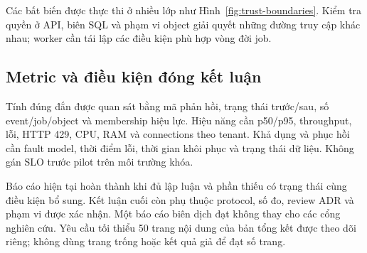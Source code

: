Các bất biến được thực thi ở nhiều lớp như Hình~\ref{fig:trust-boundaries}. Kiểm tra quyền ở API, biên SQL và phạm vi object giải quyết những đường truy cập khác nhau; worker cần tái lập các điều kiện phù hợp vòng đời job.


\subsection{Metric và điều kiện đóng kết luận}
Tính đúng đắn được quan sát bằng mã phản hồi, trạng thái trước\slash sau, số event\slash job\slash object và membership hiệu lực. Hiệu năng cần p50\slash p95, throughput, lỗi, HTTP 429, CPU, RAM và connections theo tenant. Khả dụng và phục hồi cần fault model, thời điểm lỗi, thời gian khôi phục và trạng thái dữ liệu. Không gán SLO trước pilot trên môi trường khóa.

Báo cáo hiện tại hoàn thành khi đủ lập luận và phần thiếu có trạng thái cùng điều kiện bổ sung. Kết luận cuối còn phụ thuộc protocol, số đo, review ADR và phạm vi được xác nhận. Một báo cáo biên dịch đạt không thay cho các cổng nghiên cứu. Yêu cầu tối thiểu 50 trang nội dung của bản tổng kết được theo dõi riêng; không dùng trang trống hoặc kết quả giả để đạt số trang.
